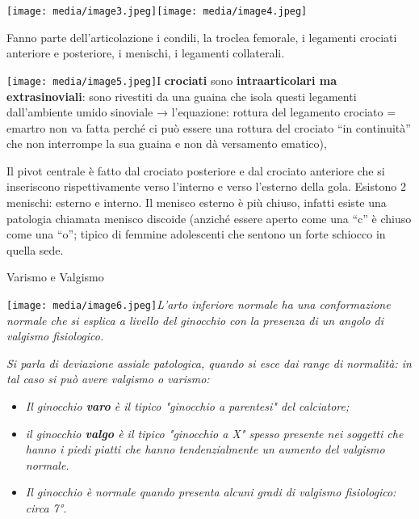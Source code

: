 \documentclass[]{article}
\begin{document}
\texttt{[image: media/image3.jpeg]}\texttt{[image: media/image4.jpeg]}

Fanno parte dell'articolazione i condili, la troclea femorale, i
legamenti crociati anteriore e posteriore, i menischi, i legamenti
collaterali.

\texttt{[image: media/image5.jpeg]}I
\textbf{crociati} sono \textbf{intraarticolari ma extrasinoviali}: sono
rivestiti da una guaina che isola questi legamenti dall'ambiente umido
sinoviale → l'equazione: rottura del legamento crociato = emartro non va
fatta perché ci può essere una rottura del crociato ``in continuità''
che non interrompe la sua guaina e non dà versamento ematico),

Il pivot centrale è fatto dal crociato posteriore e dal crociato
anteriore che si inseriscono rispettivamente verso l'interno e verso
l'esterno della gola. Esistono 2 menischi: esterno e interno. Il menisco
esterno è più chiuso, infatti esiste una patologia chiamata menisco
discoide (anziché essere aperto come una ``c'' è chiuso come una ``o'';
tipico di femmine adolescenti che sentono un forte schiocco in quella
sede.

Varismo e Valgismo

\texttt{[image: media/image6.jpeg]}\emph{L'arto
inferiore normale ha una conformazione normale che si esplica a livello
del ginocchio con la presenza di un angolo di valgismo fisiologico. }

\emph{Si parla di deviazione assiale patologica, quando si esce dai
range di normalità: in tal caso si può avere valgismo o varismo:}

\begin{itemize}
\item
  \emph{Il ginocchio \textbf{varo} è il tipico "ginocchio a parentesi"
  del calciatore; }
\item
  \emph{il ginocchio \textbf{valgo} è il tipico "ginocchio a X" spesso
  presente nei soggetti che hanno i piedi piatti che hanno
  tendenzialmente un aumento del valgismo normale. }
\item
  \emph{Il ginocchio è normale quando presenta alcuni gradi di valgismo
  fisiologico: circa 7°. }
\end{itemize}
\end{document}
